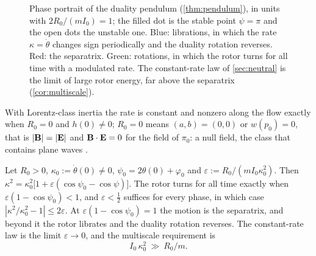 \begin{figure}[t]
\centering
{}
\caption{Phase portrait of the duality pendulum (\cref{thm:pendulum}), in units with $2R_0/(mI_0)=1$; the filled dot is the stable point
$\psi=\pi$ and the open dots the unstable one. Blue: librations, in which the rate $\kappa=\dot\theta$ changes sign periodically and the duality
rotation reverses. Red: the separatrix. Green: rotations, in which the rotor turns for all time with a modulated rate. The constant-rate law of \cref{sec:neutral} is the limit of large rotor energy, far above the
separatrix (\cref{cor:multiscale}).}
\label{fig:pendulum}
\end{figure}

\begin{corollary}
\label{cor:constrate}
With Lorentz-class inertia the rate is constant and nonzero along the flow exactly when $R_0=0$ and $h(0)\neq0$; $R_0=0$ means $(a,b)=(0,0)$ or
$w(p_0)=0$, that is $|\mathbf B|=|\mathbf E|$ and $\mathbf B\cdot\mathbf E=0$ for the field of $\pi_0$: a null field, the class that contains plane waves
\cite{Synge56,Robinson61}.
\end{corollary}

\begin{corollary}
\label{cor:multiscale}
Let $R_0>0$, $\kappa_0:=\dot\theta(0)\neq0$, $\psi_0=2\theta(0)+\varphi_0$ and $\varepsilon:=R_0/(mI_0\kappa_0^2)$. Then
$\kappa^2=\kappa_0^2\bigl[1+\varepsilon(\cos\psi_0-\cos\psi)\bigr]$. The rotor turns for all time exactly when $\varepsilon(1-\cos\psi_0)<1$, and $\varepsilon<\tfrac12$
suffices for every phase, in which case $|\kappa^2/\kappa_0^2-1|\le2\varepsilon$. At $\varepsilon(1-\cos\psi_0)=1$ the motion is the separatrix, and beyond it
the rotor librates and the duality rotation reverses. The constant-rate law is the limit $\varepsilon\to0$, and the multiscale requirement is
\begin{equation}
\label{eq:multiscale}
I_0\,\kappa_0^2\ \gg\ R_0/m .
\end{equation}
\end{corollary}

